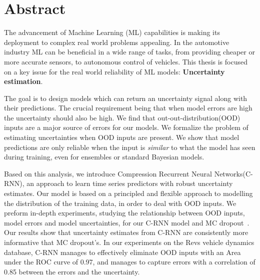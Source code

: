 
\chapter{Abstract}


The advancement of Machine Learning (ML) capabilities is making its deployment to complex real world problems appealing. In the automotive industry ML can be beneficial in a wide range of tasks, from providing cheaper or more accurate sensors, to autonomous control of vehicles. 
This thesis is focused on a key issue for the real world reliability of ML models: \textbf{Uncertainty estimation}.

The goal is to design models which can return an uncertainty signal along with their predictions. The crucial requirement being that when model errors are high the uncertainty should also be high.
We find that out-out-distribution(OOD) inputs are a major source of errors for our models. We formalize the problem of estimating uncertainties when OOD inputs are present. We show that model predictions are only reliable when the input is \emph{similar} to what the model has seen during training, even for ensembles or standard Bayesian models.  

Based on this analysis, we introduce Compression Recurrent Neural Networks(C-RNN), an approach to learn time series predictors with robust uncertainty estimates. Our model is based on a principled and flexible approach to modelling the distribution of the training data, in order to deal with OOD inputs. 
We preform in-depth experiments, studying the relationship between OOD inputs, model errors and model uncertainties, for our C-RNN model and MC dropout~\citep{gal2016dropout}. Our results show that uncertainty estimates from C-RNN are consistently more informative that MC dropout's. In our experiments on the Revs vehicle dynamics database, C-RNN manages to effectively eliminate OOD inputs with an Area under the ROC curve of 0.97, and manages to capture errors with a correlation of 0.85 between the errors and the uncertainty. 




